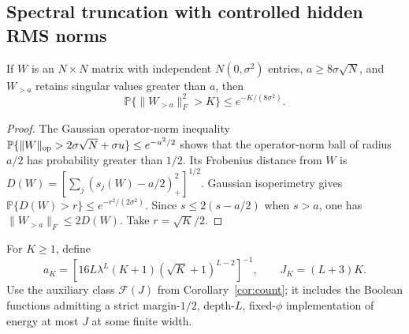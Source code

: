 \subsection{Spectral truncation with controlled hidden RMS norms}
\begin{lemma}
\label{lem:unbounded-spectral-tail}
If $W$ is an $N\times N$ matrix with independent $N(0,\sigma^2)$ entries,
$a\ge8\sigma\sqrt N$, and $W_{>a}$ retains singular values greater than
$a$, then
\[
 \mathbb P\{\|W_{>a}\|_F^2>K\}\le e^{-K/(8\sigma^2)}.
\]
\end{lemma}
\begin{proof}
The Gaussian operator-norm inequality
$\mathbb P\{\|W\|_{\rm op}>2\sigma\sqrt N+\sigma u\}\le e^{-u^2/2}$
shows that the operator-norm ball of radius $a/2$ has probability greater
than $1/2$. Its Frobenius distance from $W$ is
$D(W)=[\sum_j(s_j(W)-a/2)_+^2]^{1/2}$. Gaussian isoperimetry gives
$\mathbb P\{D(W)>r\}\le e^{-r^2/(2\sigma^2)}$.
Since $s\le2(s-a/2)$ when $s>a$, one has
$\|W_{>a}\|_F\le2D(W)$. Take $r=\sqrt K/2$.
\end{proof}

For $K\ge1$, define
\[
 a_K=\left[16L\lambda^L(K+1)(\sqrt K+1)^{L-2}\right]^{-1},
 \qquad J_K=(L+3)K.
\]
Use the auxiliary class $\mathcal F(J)$ from Corollary~\ref{cor:count};
it includes the Boolean functions admitting a strict margin-$1/2$,
depth-$L$, fixed-$\phi$ implementation of energy at most $J$ at some
finite width.

